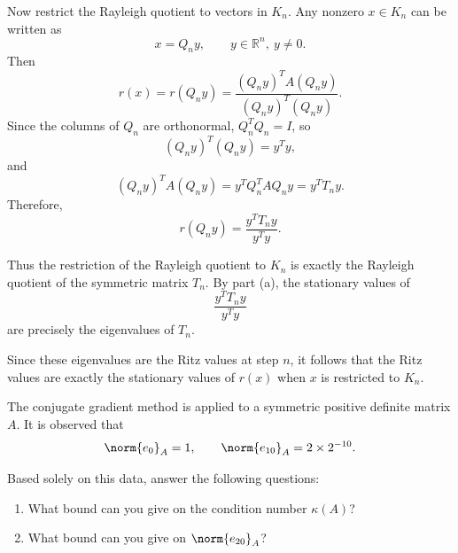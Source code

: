 \documentclass{ctexart}
\begin{document}
\begin{solution}
\begin{enumerate}
        Now restrict the Rayleigh quotient to vectors in $K_n$. Any nonzero $x\in K_n$ can be written as
        \[
          x=Q_n y,\qquad y\in\mathbb{R}^n,\ y\neq 0.
        \]
        Then
        \[
          r(x)=r(Q_n y)
          =
          \frac{(Q_n y)^T A (Q_n y)}{(Q_n y)^T(Q_n y)}.
        \]
        Since the columns of $Q_n$ are orthonormal, $Q_n^TQ_n=I$, so
        \[
          (Q_n y)^T(Q_n y)=y^T y,
        \]
        and
        \[
          (Q_n y)^T A (Q_n y)=y^T Q_n^T A Q_n y = y^T T_n y.
        \]
        Therefore,
        \[
          r(Q_n y)=\frac{y^T T_n y}{y^T y}.
        \]

        Thus the restriction of the Rayleigh quotient to $K_n$ is exactly the Rayleigh quotient
        of the symmetric matrix $T_n$. By part (a), the stationary values of
        \[
          \frac{y^T T_n y}{y^T y}
        \]
        are precisely the eigenvalues of $T_n$.

        Since these eigenvalues are the Ritz values at step $n$, it follows that the Ritz values
        are exactly the stationary values of $r(x)$ when $x$ is restricted to $K_n$.
    \end{enumerate}

  \end{solution}
  \begin{problem}\label{pro:10}
    The conjugate gradient method is applied to a symmetric positive definite matrix $A$.
    It is observed that
    \[
      \norm{e_0}_A = 1, \qquad \norm{e_{10}}_A = 2 \times 2^{-10}.
    \]

    Based solely on this data, answer the following questions:

    \begin{enumerate}[label=(\alph*)]
      \item What bound can you give on the condition number $\kappa(A)$?

      \item What bound can you give on $\norm{e_{20}}_A$?
    \end{enumerate}
  \end{problem}
\end{document}
